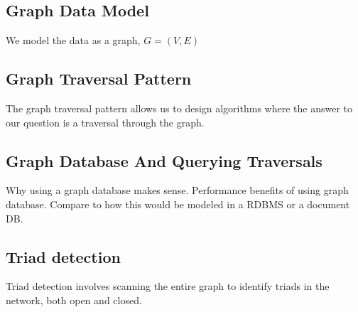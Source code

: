 \subsection{Graph Data Model}
We model the data as a graph, $G = (V, E)$ 

\subsection{Graph Traversal Pattern}
The graph traversal pattern allows us to design algorithms where the answer to our question is a traversal through the graph. 

\subsection{Graph Database And Querying Traversals}
Why using a graph database makes sense.
Performance benefits of using graph database.
Compare to how this would be modeled in a RDBMS or a document DB.

\subsection{Triad detection}

%
%    


Triad detection involves scanning the entire graph to identify triads in the network, both open and closed.

%



